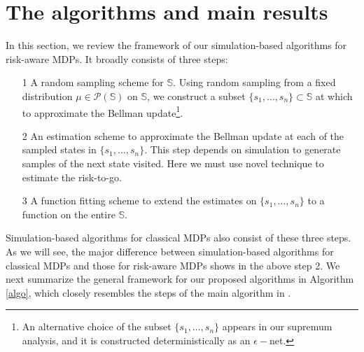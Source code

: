 \documentclass[12pt,technote,onecolumn]{IEEEtran}
\begin{document}
\section{The algorithms and main results}\label{sec3}

In this section, we review the framework of our simulation-based
algorithms for risk-aware MDPs. It broadly
consists of three steps:
\begin{enumerate}
	\item[1] A random sampling scheme for $\mathbb{S}$. Using random sampling from a fixed distribution $\mu\in\mathcal{P}\left(\mathbb{S}\right)$ on $\mathbb{S}$, we construct a subset $\{s_1,\dots, s_n\}\subset\mathbb{S}$	at which to approximate the Bellman update\footnote{An alternative choice of the subset $\{s_1,\dots,s_n\}$ appears in our supremum analysis, and it is constructed deterministically as an $\epsilon-$net.}. 
	\item[2] An estimation scheme to approximate the Bellman update at each of the sampled states in $\{s_1,\dots, s_n\}$. This step  depends
	on simulation to generate samples of the next state visited. Here we must use novel technique to estimate the risk-to-go.
	\item[3] A function fitting scheme to extend the estimates on $\{s_1,\dots, s_n\}$
to a function on the entire $\mathbb{S}$.
\end{enumerate}

Simulation-based algorithms for classical MDPs also consist of these
three steps. As we will see, the major difference between simulation-based
algorithms for classical MDPs and those for risk-aware MDPs shows
in the above step 2. We next summarize the general framework for our proposed algorithms in Algorithm \ref{algo}, which closely
resembles the steps of the main algorithm in \cite{munos2008finite}.
\end{document}
